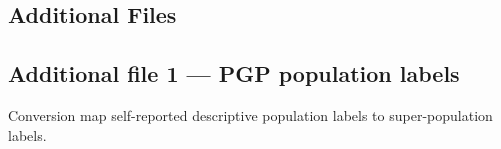 \documentclass{bmcart}
\begin{document}
\begin{backmatter}

\section*{Additional Files}
  \subsection*{Additional file 1 --- PGP population labels}
    Conversion map self-reported descriptive population labels to super-population labels.



\end{backmatter}
\end{document}
